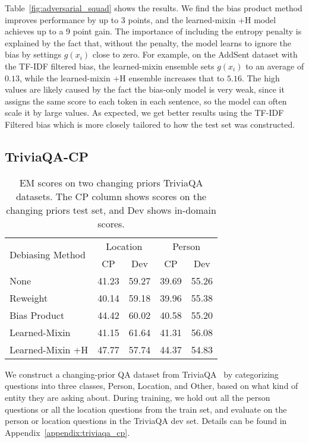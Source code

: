 \documentclass[11pt,a4paper]{article}
\begin{document}
 Table~\ref{fig:adversarial_squad} shows the results. We find the bias product method improves performance by up to 3 points, and the learned-mixin +H model achieves up to a 9 point gain. The importance of including the entropy penalty is explained by the fact that, without the penalty, the model learns to ignore the bias by settings $g(x_i)$ close to zero. 
For example, on the AddSent dataset with the TF-IDF filtered bias, the learned-mixin ensemble sets $g(x_i)$ to an average of $0.13$, while the learned-mixin +H ensemble increases that to $5.16$.
The high values are likely caused by the fact the bias-only model is very weak, since it assigns the same score to each token in each sentence, so the model can often scale it by large values.
As expected, we get better results using the TF-IDF Filtered bias which is more closely tailored to how the test set was constructed.

\subsection{TriviaQA-CP}
\label{sect:triviaqa_cp}
\begin{table}[]
    \centering
    \tablefont
\begin{tabular}{lcccc} \toprule
\multirow{2}{*}{Debiasing Method} & \multicolumn{2}{c}{Location} & \multicolumn{2}{c}{Person}\\
 & CP & Dev & CP & Dev\\ \midrule
None & 41.23 & 59.27 & 39.69 & 55.26 \\
Reweight & 40.14 & 59.18 & 39.96 & 55.38 \\
Bias Product & 44.42 & 60.02 & 40.58 & 55.20 \\
Learned-Mixin & 41.15 & 61.64 & 41.31 & 56.08 \\
Learned-Mixin +H & 47.77 & 57.74 & 44.37 & 54.83 \\
\bottomrule
\end{tabular}
    \caption{EM scores on two changing priors TriviaQA datasets. The CP column shows scores on the changing priors test set, and Dev shows in-domain scores.}
    \label{tab:triviaqa_cp}
\end{table}
 We construct a changing-prior QA dataset from TriviaQA~\cite{joshi2017triviaqa} by categorizing questions into three classes, Person, Location, and Other, based on what kind of entity they are asking about.
During training, we hold out all the person questions or all the location questions from the train set, and evaluate on the person or location questions in the TriviaQA dev set. Details can be found in Appendix~\ref{appendix:triviaqa_cp}. 
\end{document}
